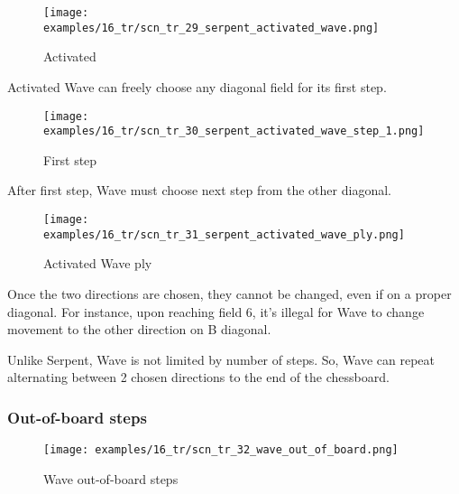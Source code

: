 \vspace*{7.0\baselineskip}
\noindent
\begin{wrapfigure}[2]{l}{0.4\textwidth}
\centering
\texttt{[image: examples/16\_tr/scn\_tr\_29\_serpent\_activated\_wave.png]}
\caption{Activated}
\label{fig:scn_tr_29_serpent_activated_wave}
\end{wrapfigure}
Activated Wave can freely choose any diagonal field for its first step.

\vspace*{8.0\baselineskip}
\noindent
\begin{wrapfigure}[2]{l}{0.4\textwidth}
\centering
\texttt{[image: examples/16\_tr/scn\_tr\_30\_serpent\_activated\_wave\_step\_1.png]}
\caption{First step}
\label{fig:scn_tr_30_serpent_activated_wave_step_1}
\end{wrapfigure}
After first step, Wave must choose next step from the other diagonal.

\clearpage %

\noindent
\begin{figure}[!h]
\texttt{[image: examples/16\_tr/scn\_tr\_31\_serpent\_activated\_wave\_ply.png]}
\caption{Activated Wave ply}
\label{fig:scn_tr_31_serpent_activated_wave_ply}
\end{figure}

Once the two directions are chosen, they cannot be changed, even if on a
proper diagonal. For instance, upon reaching field 6, it's illegal for Wave
to change movement to the other direction on B diagonal.

Unlike Serpent, Wave is not limited by number of steps. So, Wave can repeat
alternating between 2 chosen directions to the end of the chessboard.

\clearpage %

\subsubsection*{Out-of-board steps}
\label{sec:Tamoanchan Revisited/Serpent/Activating Wave/Out-of-board steps}

\vspace*{-1.0\baselineskip}
\noindent
\begin{figure}[!h]
\texttt{[image: examples/16\_tr/scn\_tr\_32\_wave\_out\_of\_board.png]}
\caption{Wave out-of-board steps}
\label{fig:scn_tr_32_wave_out_of_board}
\end{figure}

